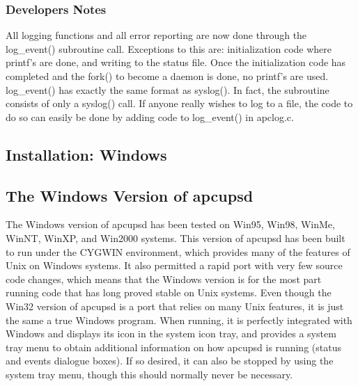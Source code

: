{{{{{{{{{{\subsubsection*{Developers Notes}

\label{index-Developers-Notes-169}
All logging functions and all error reporting are now done through the
log\_event() subroutine call. Exceptions to this are: initialization code
where printf's are done, and writing to the status file. Once the
initialization code has completed and the fork() to become a daemon is done,
no printf's are used. log\_event() has exactly the same format as syslog(). In
fact, the subroutine consists of only a syslog() call. If anyone really wishes
to log to a file, the code to do so can easily be done by adding code to
log\_event() in apclog.c. 

\label{Installation-on-Windows}

\subsection*{Installation: Windows}

\label{index-Installation_002c-Windows-170}
\label{index-Windows_002c-Installation-171}

\label{The-Windows-Version-of-apcupsd}

\subsection*{The Windows Version of apcupsd}

The Windows version of apcupsd has been tested on Win95, Win98, WinMe, WinNT,
WinXP, and Win2000 systems. This version of apcupsd has been built to run
under the CYGWIN environment, which provides many of the features of Unix on
Windows systems. It also permitted a rapid port with very few source code
changes, which means that the Windows version is for the most part running
code that has long proved stable on Unix systems. Even though the Win32
version of apcupsd is a port that relies on many Unix features, it is just the
same a true Windows program. When running, it is perfectly integrated with
Windows and displays its icon in the system icon tray, and provides a system
tray menu to obtain additional information on how apcupsd is running (status
and events dialogue boxes). If so desired, it can also be stopped by using the
system tray menu, though this should normally never be necessary.  

}}}}}}}}}}
